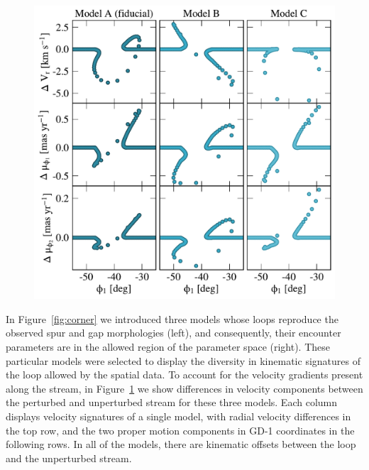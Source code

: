 \documentclass[twocolumn]{aastex62}
\begin{document}
\begin{figure}
\begin{center}
\includegraphics[width=\columnwidth]{kinematic_predictions.pdf}
\end{center}
\caption{}
\label{fig:predictions}
\end{figure}

In Figure~\ref{fig:corner} we introduced three models whose loops reproduce the observed spur and gap morphologies (left), and consequently, their encounter parameters are in the allowed region of the parameter space (right).
These particular models were selected to display the diversity in kinematic signatures of the loop allowed by the spatial data.
To account for the velocity gradients present along the stream, in Figure~\ref{fig:predictions} we show differences in velocity components between the perturbed and unperturbed stream for these three models.
Each column displays velocity signatures of a single model, with radial velocity differences in the top row, and the two proper motion components in GD-1 coordinates in the following rows.
In all of the models, there are kinematic offsets between the loop and the unperturbed stream.
\end{document}
